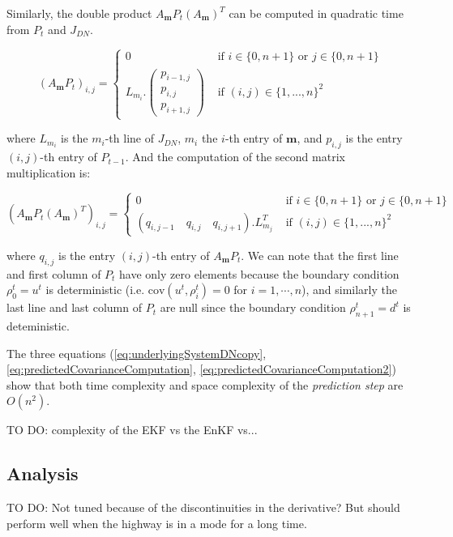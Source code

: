 \noindent Similarly, the double product $A_{\boldsymbol m}P_{t}(A_{\boldsymbol m})^{T}$ can be computed in quadratic time from $P_{t}$ and $J_{DN}$.

\begin{equation}
(A_{\boldsymbol m}P_{t})_{i,j} = \begin{cases}
0 & \text{ if } i\in\{0,n+1\}\text{ or }j\in\{0,n+1\}\\
L_{m_{i}}.\left( \begin{array}{c}
p_{i-1,j}\\
p_{i,j}\\
p_{i+1,j}
\end{array} \right) & \text{ if } (i,j)\in\{1,...,n\}^{2}
\end{cases}
\label{eq:predictedCovarianceComputation}
\end{equation}

\noindent where $L_{m_{i}}$ is the $m_{i}$-th line of $J_{DN}$, $m_{i}$ the $i$-th entry of $\boldsymbol m$, and $p_{i,j}$ is the entry $(i,j)$-th entry of $P_{t-1}$. And the computation of the second matrix multiplication is:

\begin{equation}
(A_{\boldsymbol m}P_{t}(A_{\boldsymbol m})^{T})_{i,j} = \begin{cases}
0 & \text{ if } i\in\{0,n+1\}\text{ or }j\in\{0,n+1\}\\
(q_{i,j-1}\quad q_{i,j}\quad q_{i,j+1}).L_{m_{j}}^{T} & \text{ if } (i,j)\in\{1,...,n\}^{2}
\end{cases}
\label{eq:predictedCovarianceComputation2}
\end{equation}

\noindent where $q_{i,j}$ is the entry $(i,j)$-th entry of $A_{\boldsymbol m}P_{t}$. We can note that the first line and first column of $P_{t}$ have only zero elements because the boundary condition $\rho^{t}_{0}=u^{t}$ is deterministic (i.e. $\text{cov}(u^{t},\rho^{t}_{i})=0$ for $i=1,\cdots,n$), and similarly the last line and last column of $P_{t}$ are null since the boundary condition $\rho^{t}_{n+1}=d^{t}$ is deteministic.

The three equations (\ref{eq:underlyingSystemDNcopy}, \ref{eq:predictedCovarianceComputation}, \ref{eq:predictedCovarianceComputation2}) show that both time complexity and space complexity of the \textit{prediction step} are $O(n^{2})$.

TO DO: complexity of the EKF vs the EnKF vs...

\subsection{Analysis}

TO DO: Not tuned because of the discontinuities in the derivative? But should perform well when the highway is in a mode for a long time.
